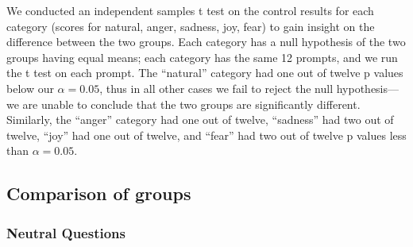 \documentclass[11pt, twoside, reqno]{book}
\begin{document}
We conducted an independent samples t test on the control results for each category (scores for natural, anger, sadness, joy, fear) to gain insight on the difference between the two groups. Each category has a null hypothesis of the two groups having equal means; each category has the same 12 prompts, and we run the t test on each prompt. The ``natural'' category had one out of twelve p values below our $\alpha = 0.05$, thus in all other cases we fail to reject the null hypothesis—we are unable to conclude that the two groups are significantly different. Similarly, the ``anger'' category had one out of twelve, ``sadness'' had two out of twelve, ``joy'' had one out of twelve, and ``fear'' had two out of twelve p values less than $\alpha = 0.05$.

\subsection{Comparison of groups}


\subsubsection{\textbf{Neutral Questions}}
\end{document}
